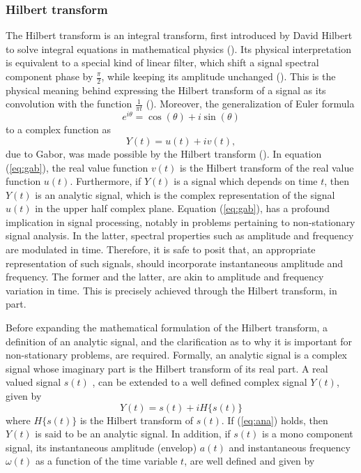 \documentclass[../Main/thesis.tex]{subfiles}
\begin{document}
\justify
\subsubsection{Hilbert transform}
The Hilbert transform is an integral transform, first introduced by David Hilbert to solve integral equations in mathematical physics (\cite{gabor1982}). Its physical interpretation is equivalent to a special kind of linear filter, which shift a signal spectral component phase by $\frac{\pi}{2}$, while keeping its amplitude unchanged (\cite{feldman2010}). This is the physical meaning behind expressing the Hilbert transform of a signal as its convolution with the function $\frac{1}{\pi t}$ (\cite{feldman2010}). 
Moreover, the generalization of Euler formula
\begin{equation}
	e^{i\theta} = \cos(\theta) + i\sin(\theta)
\end{equation}
 to a complex function as
 \begin{equation}\label{eq:gab}
 	  Y(t) = u(t) +iv(t),
 \end{equation}
due to Gabor, was made possible by the Hilbert transform (\cite{feldman2010}). In equation (\ref{eq:gab}), the real value function $v(t)$ is the Hilbert transform of the real value function $u(t)$. Furthermore, if $Y(t)$ is a signal which depends on time $t$, then $Y(t)$ is an analytic signal, which is the complex representation of the signal $u(t)$ in the upper half complex plane.
\justify
Equation (\ref{eq:gab}), has a profound implication in signal processing, notably in problems pertaining to non-stationary signal analysis. In the latter,  spectral properties such as amplitude and frequency are modulated in time. Therefore, it is safe to posit that, an appropriate representation of such signals, should incorporate instantaneous amplitude and frequency. The former and the latter, are akin to amplitude and frequency variation in time. This is precisely achieved through the Hilbert transform, in part.


\justify
Before expanding the mathematical formulation of the Hilbert transform, a definition of an analytic signal, and the clarification as to why it is important for non-stationary problems, are required.
Formally, an analytic signal is a complex signal whose imaginary part is the Hilbert transform of its real part. A real valued signal $s(t)$ , can be extended to a well defined complex signal $Y(t)$, given by
\begin{equation}\label{eq:ana}
Y(t) = s(t) + i H\{ s(t)\}
\end{equation}
where $H\{ s(t)\}$ is the Hilbert transform of $s(t)$. If (\ref{eq:ana}) holds, then $Y(t)$ is said to be an analytic signal. In addition, if $s(t)$ is a mono component signal, its instantaneous amplitude (envelop) $a(t)$ and instantaneous frequency $\omega(t)$ as a function of the time variable $t$, are well defined and given by
\end{document}
